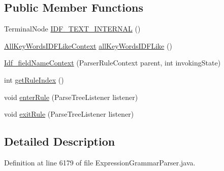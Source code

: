 \subsection*{Public Member Functions}
\begin{DoxyCompactItemize}
\item 
Terminal\+Node \hyperlink{classgov_1_1nasa_1_1jpf_1_1inspector_1_1server_1_1expression_1_1parser_1_1_expression_grammar_pad53202cd69742416986508e382be2265_abde59cbae92fb7d1d41d446f8b96084b}{I\+D\+F\+\_\+\+T\+E\+X\+T\+\_\+\+I\+N\+T\+E\+R\+N\+AL} ()
\item 
\hyperlink{classgov_1_1nasa_1_1jpf_1_1inspector_1_1server_1_1expression_1_1parser_1_1_expression_grammar_pad664d42a2aee14226e172b869b9ffb3b}{All\+Key\+Words\+I\+D\+F\+Like\+Context} \hyperlink{classgov_1_1nasa_1_1jpf_1_1inspector_1_1server_1_1expression_1_1parser_1_1_expression_grammar_pad53202cd69742416986508e382be2265_abc7fb192180ed0c61325d770a634389c}{all\+Key\+Words\+I\+D\+F\+Like} ()
\item 
\hyperlink{classgov_1_1nasa_1_1jpf_1_1inspector_1_1server_1_1expression_1_1parser_1_1_expression_grammar_pad53202cd69742416986508e382be2265_a28af631dcb34532a6c2bd655b104022d}{Idf\+\_\+field\+Name\+Context} (Parser\+Rule\+Context parent, int invoking\+State)
\item 
int \hyperlink{classgov_1_1nasa_1_1jpf_1_1inspector_1_1server_1_1expression_1_1parser_1_1_expression_grammar_pad53202cd69742416986508e382be2265_ab9092bfa26f610d1b4261df5658d8522}{get\+Rule\+Index} ()
\item 
void \hyperlink{classgov_1_1nasa_1_1jpf_1_1inspector_1_1server_1_1expression_1_1parser_1_1_expression_grammar_pad53202cd69742416986508e382be2265_aa3aa35df340309e88094f135b56aac48}{enter\+Rule} (Parse\+Tree\+Listener listener)
\item 
void \hyperlink{classgov_1_1nasa_1_1jpf_1_1inspector_1_1server_1_1expression_1_1parser_1_1_expression_grammar_pad53202cd69742416986508e382be2265_aa9fca28bcff1ed7325f3927cd0425e60}{exit\+Rule} (Parse\+Tree\+Listener listener)
\end{DoxyCompactItemize}


\subsection{Detailed Description}


Definition at line 6179 of file Expression\+Grammar\+Parser.\+java.



